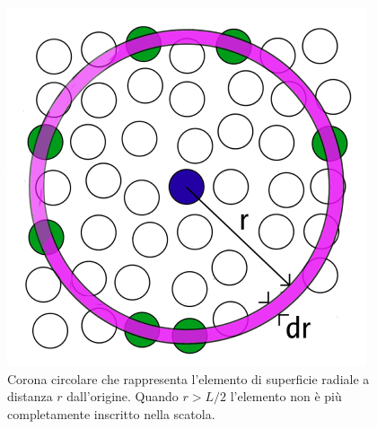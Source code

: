 \documentclass[11pt]{article}
\theoremstyle{plain}
\theoremstyle{remark}
\begin{document}
\begin{itemize}
\begin{figure}[htbp]
     \begin{minipage}{0.4\textwidth}
		\begin{flushright}
		\includegraphics[scale=1.25]{Immagini/RDF.png}
		\end{flushright}
     \end{minipage}\hfill
     \begin{minipage}{0.55\textwidth}
     	\begin{flushleft}
		\caption[Funzione di Distribuzione Radiale]{\footnotesize Corona circolare che rappresenta l'elemento di superficie radiale a distanza $r$ dall'origine. Quando $r>L/2$ l'elemento non è più completamente inscritto nella scatola.}\label{fig: RDF}
     \end{flushleft}
     \end{minipage}
  \end{figure}


\end{itemize}
\end{document}
